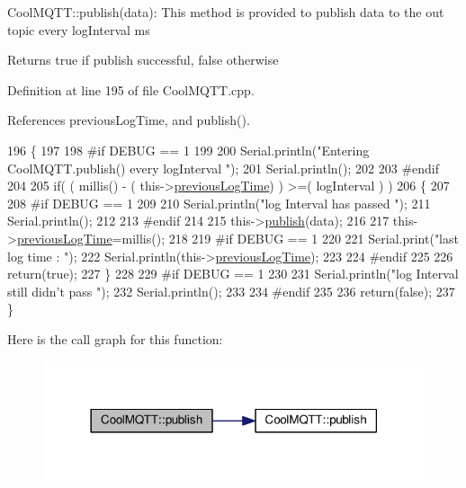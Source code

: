 Cool\+M\+Q\+T\+T\+::publish(data)\+: This method is provided to publish data to the out topic every log\+Interval ms

\begin{DoxyReturn}{Returns}
true if publish successful, false otherwise 
\end{DoxyReturn}


Definition at line 195 of file Cool\+M\+Q\+T\+T.\+cpp.



References previous\+Log\+Time, and publish().


\begin{DoxyCode}
196 \{
197 
198 \textcolor{preprocessor}{#if DEBUG == 1 }
199 
200     Serial.println(\textcolor{stringliteral}{"Entering CoolMQTT.publish() every logInterval "});
201     Serial.println();
202 
203 \textcolor{preprocessor}{#endif }
204     
205     \textcolor{keywordflow}{if}( ( millis() - ( this->\hyperlink{classCoolMQTT_a3db37ef9ed3b05b2a8d44edba0e7d3cc}{previousLogTime})  ) >=( logInterval ) )
206     \{
207     
208 \textcolor{preprocessor}{    #if DEBUG == 1}
209 
210         Serial.println(\textcolor{stringliteral}{"log Interval has passed "});
211         Serial.println();
212     
213 \textcolor{preprocessor}{    #endif}
214 
215         this->\hyperlink{classCoolMQTT_ace977b3e90ab14b1199fe5c4fb0a13ec}{publish}(data);
216 
217         this->\hyperlink{classCoolMQTT_a3db37ef9ed3b05b2a8d44edba0e7d3cc}{previousLogTime}=millis();
218     
219 \textcolor{preprocessor}{    #if DEBUG == 1 }
220 
221         Serial.print(\textcolor{stringliteral}{"last log time : "});
222         Serial.println(this->\hyperlink{classCoolMQTT_a3db37ef9ed3b05b2a8d44edba0e7d3cc}{previousLogTime});
223 
224 \textcolor{preprocessor}{    #endif}
225 
226         \textcolor{keywordflow}{return}(\textcolor{keyword}{true});
227     \}
228 
229 \textcolor{preprocessor}{#if DEBUG == 1 }
230 
231     Serial.println(\textcolor{stringliteral}{"log Interval still didn't pass "});  
232     Serial.println();
233 
234 \textcolor{preprocessor}{#endif}
235 
236     \textcolor{keywordflow}{return}(\textcolor{keyword}{false});
237 \}
\end{DoxyCode}
Here is the call graph for this function\+:
\nopagebreak
\begin{figure}[H]
\begin{center}
\leavevmode
\includegraphics[width=318pt]{classCoolMQTT_a65a506641740ce797ceadd4fa8a286d3_cgraph}
\end{center}
\end{figure}
\mbox{\label{classCoolMQTT_ae3c18f6ae9723746d32765f1c8f176ca}} 
